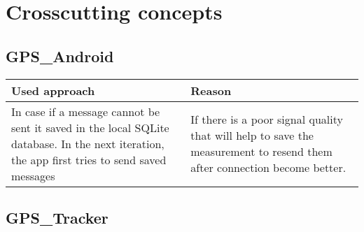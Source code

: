 \section{Crosscutting concepts}\label{crosscutting-concepts}

\subsection{GPS\_Android}\label{gps_android}

\begin{longtable}[]{@{}ll@{}}
\toprule
\begin{minipage}[b]{0.47\columnwidth}\raggedright
Used approach\strut
\end{minipage} & \begin{minipage}[b]{0.47\columnwidth}\raggedright
Reason\strut
\end{minipage}\tabularnewline
\midrule
\endhead
\begin{minipage}[t]{0.47\columnwidth}\raggedright
In case if a message cannot be sent it saved in the local SQLite
database. In the next iteration, the app first tries to send saved
messages\strut
\end{minipage} & \begin{minipage}[t]{0.47\columnwidth}\raggedright
If there is a poor signal quality that will help to save the measurement
to resend them after connection become better.\strut
\end{minipage}\tabularnewline
\bottomrule
\end{longtable}

\subsection{GPS\_Tracker}\label{gps_tracker}

